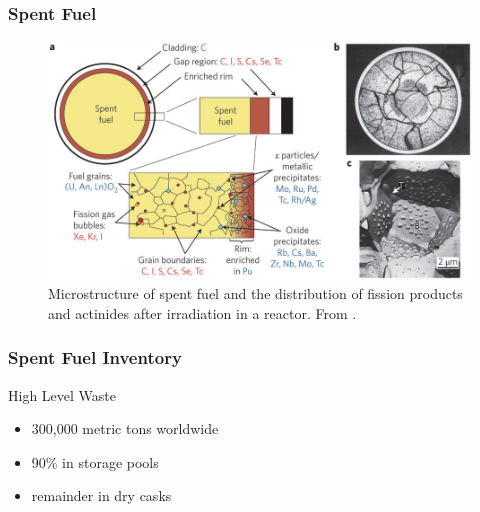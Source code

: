 \begin{frame}[fragile]
        \frametitle{Spent Fuel}
        \begin{figure}
        \includegraphics[width=\textwidth]{./images/ewing-microstructure}
                \caption{Microstructure of spent fuel and the distribution of
                fission products and actinides after irradiation in a reactor.
                From \cite{ewing_long-term_2015}.}
        \end{figure}
\end{frame}

\begin{frame}[fragile]
        \frametitle{Spent Fuel Inventory}
\begin{block}{High Level Waste}
        \begin{itemize}
                \item 300,000 metric tons worldwide
                        \cite{ewing_long-term_2015}
                \item 90\% in storage pools
                \item remainder in dry casks
        \end{itemize}
        \end{block}
\end{frame}

